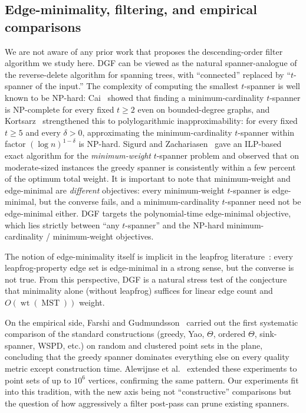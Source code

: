\documentclass{article}
\DeclareMathOperator{\wt}{wt}
\DeclareMathOperator{\MST}{MST}
\begin{document}
\subsection{Edge-minimality, filtering, and empirical comparisons}
\label{subsec:rw-minimality}

We are not aware of any prior work that proposes the descending-order
filter algorithm we study here. DGF can be viewed as the natural
spanner-analogue of the reverse-delete algorithm for spanning trees,
with ``connected'' replaced by ``$t$-spanner of the input.'' The
complexity of computing the smallest $t$-spanner is well known to be
NP-hard: Cai~\cite{Cai94} showed that finding a minimum-cardinality
$t$-spanner is NP-complete for every fixed $t\ge 2$ even on
bounded-degree graphs, and Kortsarz~\cite{Kortsarz01} strengthened
this to polylogarithmic inapproximability: for every fixed $t\ge 5$
and every $\delta>0$, approximating the minimum-cardinality $t$-spanner
within factor $(\log n)^{1-\delta}$ is NP-hard. Sigurd and
Zachariasen~\cite{SZ04} gave an ILP-based exact algorithm for the
\emph{minimum-weight} $t$-spanner problem and observed that on
moderate-sized instances the greedy spanner is consistently within a
few percent of the optimum total weight. It is important to note
that minimum-weight and edge-minimal are \emph{different} objectives:
every minimum-weight $t$-spanner is edge-minimal, but the converse
fails, and a minimum-cardinality $t$-spanner need not be edge-minimal
either. DGF targets the polynomial-time edge-minimal objective, which
lies strictly between ``any $t$-spanner'' and the NP-hard
minimum-cardinality / minimum-weight objectives.

The notion of edge-minimality itself is implicit in the
leapfrog literature~\cite{DHN93,DNS95}: every leapfrog-property edge
set is edge-minimal in a strong sense, but the converse is not true.
From this perspective, DGF is a natural stress test of the conjecture
that minimality alone (without leapfrog) suffices for linear edge
count and $O(\wt(\MST))$ weight.

On the empirical side, Farshi and Gudmundsson~\cite{FG09} carried out
the first systematic comparison of the standard constructions (greedy,
Yao, $\Theta$, ordered $\Theta$, sink-spanner, WSPD, etc.) on random and
clustered point sets in the plane, concluding that the greedy spanner
dominates everything else on every quality metric except construction
time. Alewijnse et al.~\cite{ABBB15} extended these experiments to
point sets of up to $10^6$ vertices, confirming the same pattern. Our
experiments fit into this tradition, with the new axis being not
``constructive'' comparisons but the question of how aggressively a
filter post-pass can prune existing spanners.
\end{document}
